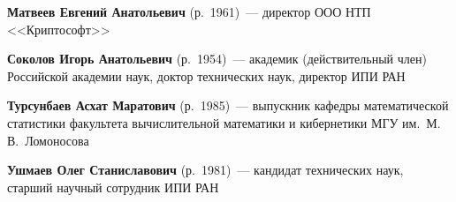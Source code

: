 \begin{multicols}{2}
\noindent
\textbf{Матвеев Евгений Анатольевич} (р.\ 1961)~---  директор ООО
НТП <<Криптософт>>

\vspace*{6pt}

\noindent %
\textbf{Соколов Игорь Анатольевич} (р.\ 1954)~---
академик (действительный член) Российской академии наук,
доктор технических наук,
директор ИПИ РАН


\vspace*{6pt}

\noindent
\textbf{Турсунбаев Асхат Маратович} (р.\ 1985)~---
выпускник кафедры математической статистики факультета вычислительной
математики и кибернетики МГУ им.\ М.\,В.~Ломоносова

\vspace*{6pt}

\noindent
\textbf{Ушмаев Олег Станиславович} (р.\ 1981)~---  кандидат
технических наук, старший научный сотрудник ИПИ РАН


\end{multicols}